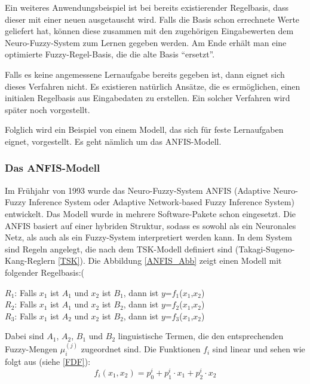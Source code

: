 Ein weiteres Anwendungsbeispiel ist bei bereits existierender Regelbasis, dass dieser mit einer neuen ausgetauscht wird. Falls die Basis schon errechnete Werte geliefert hat, können diese zusammen mit den zugehörigen Eingabewerten dem Neuro-Fuzzy-System zum Lernen gegeben werden. Am Ende erhält man eine optimierte Fuzzy-Regel-Basis, die die alte Basis ``ersetzt''.

Falls es keine angemessene Lernaufgabe bereits gegeben ist, dann eignet sich dieses Verfahren nicht. Es existieren natürlich Ansätze, die es ermöglichen, einen initialen Regelbasis aus Eingabedaten zu erstellen. Ein solcher Verfahren wird später noch vorgestellt.

Folglich wird ein Beispiel von einem Modell, das sich für feste Lernaufgaben eignet, vorgestellt. Es geht nämlich um das ANFIS-Modell.

\subsubsection{Das ANFIS-Modell}

Im Frühjahr von 1993 wurde das Neuro-Fuzzy-System ANFIS (Adaptive Neuro-Fuzzy Inference System oder Adaptive Network-based Fuzzy Inference System) entwickelt. Das Modell wurde in mehrere Software-Pakete schon eingesetzt. Die ANFIS basiert auf einer hybriden Struktur, sodass es sowohl als ein Neuronales Netz, als auch als ein Fuzzy-System interpretiert werden kann. In dem System sind Regeln angelegt, die nach dem TSK-Modell definiert sind (Takagi-Sugeno-Kang-Reglern \ref{TSK}). Die Abbildung \ref{ANFIS_Abb} zeigt einen Modell mit folgender Regelbasis:(%

\begin{center}
	$R_1$: Falls $x_1$ ist $A_1$ und $x_2$ ist $B_1$, dann ist $y$=$f_1$($x_1$,$x_2$)\\
	
	$R_2$: Falls $x_1$ ist $A_1$ und $x_2$ ist $B_2$, dann ist $y$=$f_2$($x_1$,$x_2$)\\
	
	$R_3$: Falls $x_1$ ist $A_2$ und $x_2$ ist $B_2$, dann ist $y$=$f_3$($x_1$,$x_2$)\\
\end{center}

Dabei sind $A_1$, $A_2$, $B_1$ und $B_2$ linguistische Termen, die den entsprechenden Fuzzy-Mengen $\mu_i^{(j)}$ zugeordnet sind. Die Funktionen $f_i$ sind linear und sehen wie folgt aus (siehe \ref{FDF}):
\begin{equation}
	f_i(x_1, x_2) = p_0^{i} + p_1^{i}\cdot x_1 + p_2^{i}\cdot x_2
\end{equation}

